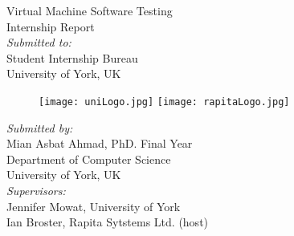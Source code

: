 \documentclass[11pt,a4paper]{report}
\begin{document}
  \begin{titlepage}
    \centering
    {\fontsize{23}{33}\selectfont Virtual Machine Software Testing}\\[1\baselineskip]
     {\fontsize{18}{28}\selectfont Internship Report}\\[2.5\baselineskip]
    
    
    
    {\fontsize{12}{22}\selectfont \it {Submitted to:} }\\[0.5\baselineskip]    
     {\fontsize{15}{25}\selectfont Student Internship Bureau }\\[.5\baselineskip]    
     {\fontsize{15}{25}\selectfont  University of York, UK }\\[2\baselineskip]    


\begin{figure}[h]
\centering
\texttt{[image: uniLogo.jpg]}
\texttt{[image: rapitaLogo.jpg]}
\label{overflow}
\end{figure}



 {\fontsize{12}{22}\selectfont \it {Submitted by:} }\\[0.5\baselineskip]    
     {\fontsize{14}{24}\selectfont Mian Asbat Ahmad, PhD. Final Year }\\[0.5\baselineskip]
      {\fontsize{13}{23}\selectfont Department of Computer Science}\\[0.5\baselineskip]    
     {\fontsize{13}{23}\selectfont  University of York, UK }\\[2\baselineskip]    



     
     {\fontsize{12}{22}\selectfont \it {Supervisors:} }\\[0.5\baselineskip]    
     {\fontsize{14}{24}\selectfont Jennifer Mowat, University of York }\\[0.5\baselineskip]
    {\fontsize{14}{24}\selectfont Ian Broster, Rapita Sytstems Ltd. (host)}\\[0.5\baselineskip]
     
 
  \end{titlepage}
\end{document}
